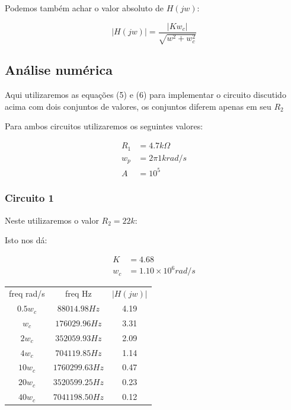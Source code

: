 \documentclass[12pt,twoside, a4paper, twocolumn]{article}
\begin{document}
Podemos também achar o valor absoluto de $H(jw)$:


\begin{equation}
    \lvert H(jw) \rvert = \frac{\left|{K w_{c}}\right|}{\sqrt{w^{2} + w_{c}^{2}}}
\end{equation}


\subsection{Análise numérica}


Aqui utilizaremos as equações (5) e (6) para implementar o circuito discutido acima com dois conjuntos de valores, os conjuntos diferem apenas em seu $R_2$


Para ambos circuitos utilizaremos os seguintes valores:


\begin{equation}
    \begin{aligned}
        R_1 & = 4.7k \varOmega \\
        w_p & = 2 \pi 1k rad/s \\
        A   & = 10^5
    \end{aligned}
\end{equation}


\subsubsection{Circuito 1}


Neste utilizaremos o valor  $R_2 = 22k$:


Isto nos dá:


\begin{equation}
    \begin{aligned}
        K   & = 4.68                     \\
        w_c & = 1.10 \times 10^{6} rad/s
    \end{aligned}
\end{equation}


\begin{center}
    \begin{tabular}{ |c|c|c| }
        \hline
        freq rad/s & freq Hz         & $\lvert H(jw) \rvert$ \\
        $0.5 w_c$  & $88014.98 Hz$   & 4.19                  \\
        $w_c$      & $176029.96 Hz$  & 3.31                  \\
        $2 w_c$    & $352059.93 Hz$  & 2.09                  \\
        $4 w_c$    & $704119.85 Hz$  & 1.14                  \\
        $10 w_c$   & $1760299.63 Hz$ & 0.47                  \\
        $20 w_c$   & $3520599.25 Hz$ & 0.23                  \\
        $40 w_c$   & $7041198.50 Hz$ & 0.12                  \\
        \hline
    \end{tabular}
\end{center}
\end{document}
